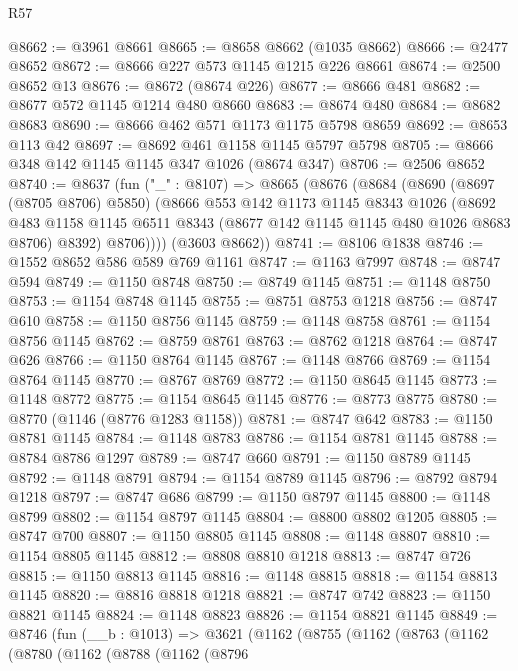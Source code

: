\begin{lexlean}{R57}
\begin{coremodule}
@8662 := @3961 @8661
@8665 := @8658 @8662 (@1035 @8662)
@8666 := @2477 @8652
@8672 := @8666 @227 @573 @1145 @1215 @226 @8661
@8674 := @2500 @8652 @13
@8676 := @8672 (@8674 @226)
@8677 := @8666 @481
@8682 := @8677 @572 @1145 @1214 @480 @8660
@8683 := @8674 @480
@8684 := @8682 @8683
@8690 := @8666 @462 @571 @1173 @1175 @5798 @8659
@8692 := @8653 @113 @42
@8697 := @8692 @461 @1158 @1145 @5797 @5798
@8705 := @8666 @348 @142 @1145 @1145 @347 @1026 (@8674 @347)
@8706 := @2506 @8652
@8740 := @8637
    (fun ("_" : @8107) =>
    @8665
      (@8676
        (@8684
          (@8690
            (@8697 (@8705 @8706) @5850)
            (@8666
              @553
              @142
              @1173
              @1145
              @8343
              @1026
              (@8692
                @483
                @1158
                @1145
                @6511
                @8343
                (@8677 @142 @1145 @1145 @480 @1026 @8683 @8706)
                @8392)
              @8706))))
      (@3603 @8662))
@8741 := @8106 @1838
@8746 := @1552 @8652 @586 @589 @769 @1161
@8747 := @1163 @7997
@8748 := @8747 @594
@8749 := @1150 @8748
@8750 := @8749 @1145
@8751 := @1148 @8750
@8753 := @1154 @8748 @1145
@8755 := @8751 @8753 @1218
@8756 := @8747 @610
@8758 := @1150 @8756 @1145
@8759 := @1148 @8758
@8761 := @1154 @8756 @1145
@8762 := @8759 @8761
@8763 := @8762 @1218
@8764 := @8747 @626
@8766 := @1150 @8764 @1145
@8767 := @1148 @8766
@8769 := @1154 @8764 @1145
@8770 := @8767 @8769
@8772 := @1150 @8645 @1145
@8773 := @1148 @8772
@8775 := @1154 @8645 @1145
@8776 := @8773 @8775
@8780 := @8770 (@1146 (@8776 @1283 @1158))
@8781 := @8747 @642
@8783 := @1150 @8781 @1145
@8784 := @1148 @8783
@8786 := @1154 @8781 @1145
@8788 := @8784 @8786 @1297
@8789 := @8747 @660
@8791 := @1150 @8789 @1145
@8792 := @1148 @8791
@8794 := @1154 @8789 @1145
@8796 := @8792 @8794 @1218
@8797 := @8747 @686
@8799 := @1150 @8797 @1145
@8800 := @1148 @8799
@8802 := @1154 @8797 @1145
@8804 := @8800 @8802 @1205
@8805 := @8747 @700
@8807 := @1150 @8805 @1145
@8808 := @1148 @8807
@8810 := @1154 @8805 @1145
@8812 := @8808 @8810 @1218
@8813 := @8747 @726
@8815 := @1150 @8813 @1145
@8816 := @1148 @8815
@8818 := @1154 @8813 @1145
@8820 := @8816 @8818 @1218
@8821 := @8747 @742
@8823 := @1150 @8821 @1145
@8824 := @1148 @8823
@8826 := @1154 @8821 @1145
@8849 := @8746
    (fun (__b : @1013) =>
    @3621
      (@1162
        (@8755
          (@1162
            (@8763
              (@1162
                (@8780
                  (@1162
                    (@8788
                      (@1162
                        (@8796

\end{coremodule}
\end{lexlean}
